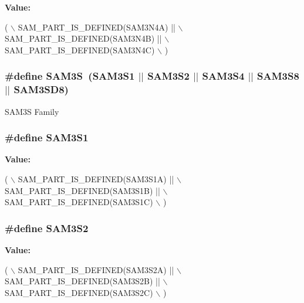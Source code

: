 {\bfseries Value\-:}
\begin{DoxyCode}
( \(\backslash\)
                SAM\_PART\_IS\_DEFINED(SAM3N4A) || \(\backslash\)
                SAM\_PART\_IS\_DEFINED(SAM3N4B) || \(\backslash\)
                SAM\_PART\_IS\_DEFINED(SAM3N4C) \(\backslash\)
                )
\end{DoxyCode}
\hypertarget{group__sam__part__macros__group_gaaa8d9ee5981c67997fbdf923247bcb68}{
\subsubsection[{S\-A\-M3\-S}]{\setlength{\rightskip}{0pt plus 5cm}\#define S\-A\-M3\-S~(S\-A\-M3\-S1 $|$$|$ S\-A\-M3\-S2 $|$$|$ S\-A\-M3\-S4 $|$$|$ S\-A\-M3\-S8 $|$$|$ S\-A\-M3\-S\-D8)}}\label{group__sam__part__macros__group_gaaa8d9ee5981c67997fbdf923247bcb68}
S\-A\-M3\-S Family \hypertarget{group__sam__part__macros__group_gac1f138c6fe48b20faa71fb2d68d68b52}{
\subsubsection[{S\-A\-M3\-S1}]{\setlength{\rightskip}{0pt plus 5cm}\#define S\-A\-M3\-S1}}\label{group__sam__part__macros__group_gac1f138c6fe48b20faa71fb2d68d68b52}
{\bfseries Value\-:}
\begin{DoxyCode}
( \(\backslash\)
                SAM\_PART\_IS\_DEFINED(SAM3S1A) || \(\backslash\)
                SAM\_PART\_IS\_DEFINED(SAM3S1B) || \(\backslash\)
                SAM\_PART\_IS\_DEFINED(SAM3S1C) \(\backslash\)
                )
\end{DoxyCode}
\hypertarget{group__sam__part__macros__group_ga3665c1cc7fa5ad33231fde9e16b562cd}{
\subsubsection[{S\-A\-M3\-S2}]{\setlength{\rightskip}{0pt plus 5cm}\#define S\-A\-M3\-S2}}\label{group__sam__part__macros__group_ga3665c1cc7fa5ad33231fde9e16b562cd}
{\bfseries Value\-:}
\begin{DoxyCode}
( \(\backslash\)
                SAM\_PART\_IS\_DEFINED(SAM3S2A) || \(\backslash\)
                SAM\_PART\_IS\_DEFINED(SAM3S2B) || \(\backslash\)
                SAM\_PART\_IS\_DEFINED(SAM3S2C) \(\backslash\)
                )
\end{DoxyCode}
